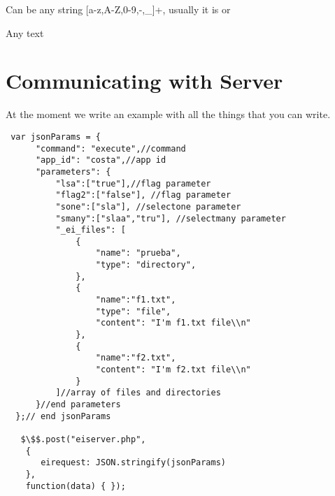 \noindent
{}

Can be any string [a-z,A-Z,0-9,-,\_]+, usually it is  or 

\noindent
{}

Any text

\bigskip
\bigskip
\section{Communicating with \ei Server}

At the moment we write an example with
 all the things that you can write.

\begin{lstlisting}
 var jsonParams = {
      "command": "execute",//command
      "app_id": "costa",//app id
      "parameters": {
          "lsa":["true"],//flag parameter
          "flag2":["false"], //flag parameter
          "sone":["sla"], //selectone parameter
          "smany":["slaa","tru"], //selectmany parameter
          "_ei_files": [
              {
                  "name": "prueba",
                  "type": "directory",
              },
              {
                  "name":"f1.txt",
                  "type": "file",
                  "content": "I'm f1.txt file\\n"
              },
              {
                  "name":"f2.txt",
                  "content": "I'm f2.txt file\\n"
              }
          ]//array of files and directories
      }//end parameters
  };// end jsonParams

   $\$$.post("eiserver.php",
    {
       eirequest: JSON.stringify(jsonParams)
    },
    function(data) { });
\end{lstlisting}


